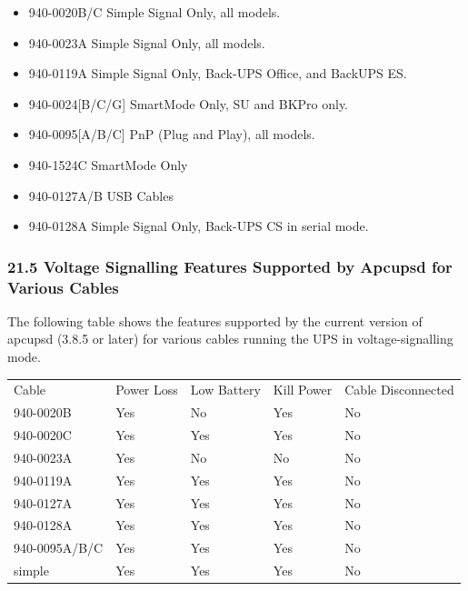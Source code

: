 \begin{itemize}
\item 940-0020B/C Simple Signal Only, all models.  
\item 940-0023A Simple Signal Only, all models.  
\item 940-0119A Simple Signal Only, Back-UPS Office, and BackUPS ES.  
\item 940-0024[B/C/G] SmartMode Only, SU and BKPro only.  
\item 940-0095[A/B/C] PnP (Plug and Play), all models.  
\item 940-1524C SmartMode Only  
\item 940-0127A/B USB Cables  
\item 940-0128A Simple Signal Only, Back-UPS CS in serial mode. 
\end{itemize}

\label{Voltage-Signalling-Features-Supported-by-Apcupsd-for-Various-Cables}

\subsubsection*{21.5 Voltage Signalling Features Supported by Apcupsd for
Various Cables}

The following table shows the features supported by the current version of
apcupsd (3.8.5 or later) for various cables running the UPS in
voltage-signalling mode.  

\begin{longtable}{lllll}
{Cable} & {Power Loss} & {Low Battery} & {Kill Power} & {Cable Disconnected 
 } \\
{940-0020B} & {Yes} & {No} & {Yes} & {No 
 } \\
{940-0020C} & {Yes} & {Yes} & {Yes} & {No 
 } \\
{940-0023A} & {Yes} & {No} & {No} & {No 
 } \\
{940-0119A} & {Yes} & {Yes} & {Yes} & {No 
 } \\
{940-0127A} & {Yes} & {Yes} & {Yes} & {No 
 } \\
{940-0128A} & {Yes} & {Yes} & {Yes} & {No 
 } \\
{940-0095A/B/C} & {Yes} & {Yes} & {Yes} & {No 
 } \\
{simple} & {Yes} & {Yes} & {Yes} & {No  
}

\end{longtable}

